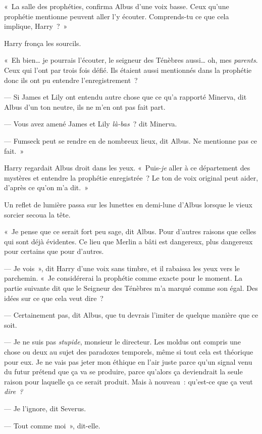 «~La salle des prophéties, confirma Albus d'une voix basse.
Ceux qu'une prophétie mentionne peuvent aller l'y écouter.
Comprends-tu ce que cela implique, Harry~?~»

Harry fronça les sourcils.

«~Eh bien… je pourrais l'écouter, le seigneur des Ténèbres aussi… oh, mes \emph{parents}.
Ceux qui l'ont par trois fois défié.
Ils étaient aussi mentionnés dans la prophétie donc ils ont pu entendre l'enregistrement~?

--- Si James et Lily ont entendu autre chose que ce qu'a rapporté Minerva, dit Albus d'un ton neutre, ils ne m'en ont pas fait part.

--- Vous avez amené James et Lily \emph{là-bas}~? dit Minerva.

--- Fumseck peut se rendre en de nombreux lieux, dit Albus.
Ne mentionne pas ce fait.~»

Harry regardait Albus droit dans les yeux.
«~Puis-\emph{je} aller à ce département des mystères et entendre la prophétie enregistrée~?
Le ton de voix original peut aider, d'après ce qu'on m'a dit.~»

Un reflet de lumière passa sur les lunettes en demi-lune d'Albus lorsque le vieux sorcier secoua la tête.

«~Je pense que ce serait fort peu sage, dit Albus.
Pour d'autres raisons que celles qui sont déjà évidentes.
Ce lieu que Merlin a bâti est dangereux, plus dangereux pour certains que pour d'autres.

--- Je vois~», dit Harry d'une voix sans timbre, et il rabaissa les yeux vers le parchemin.
«~Je considérerai la prophétie comme exacte pour le moment.
La partie suivante dit que le Seigneur des Ténèbres m'a marqué comme son égal.
Des idées sur ce que cela veut dire~?

--- Certainement pas, dit Albus, que tu devrais l'imiter de quelque manière que ce soit.

--- Je ne suis pas \emph{stupide}, monsieur le directeur.
Les moldus ont compris une chose ou deux au sujet des paradoxes temporels, même si tout cela est théorique pour eux.
Je ne vais pas jeter mon éthique en l'air juste parce qu'un signal venu du futur prétend que ça va se produire, parce qu'alors ça deviendrait la seule raison pour laquelle ça ce serait produit.
Mais à nouveau~: qu'est-ce que ça veut \emph{dire~?}

--- Je l'ignore, dit Severus.

--- Tout comme moi~», dit-elle.

